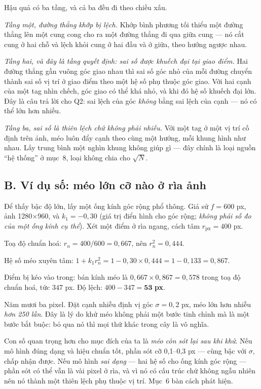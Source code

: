 \documentclass[../../marker.tex]{subfiles}
\begin{document}
Hậu quả có ba tầng, và cả ba đều đi theo chiều xấu.

\emph{Tầng một, đường thẳng khớp bị lệch.} Khớp bình phương tối thiểu một đường thẳng lên một cung cong cho ra một đường thẳng đi qua giữa cung --- nó cắt cung ở hai chỗ và lệch khỏi cung ở hai đầu và ở giữa, theo hướng ngược nhau.

\emph{Tầng hai, và đây là tầng quyết định: sai số được \emph{khuếch đại} tại giao điểm.} Hai đường thẳng gần vuông góc giao nhau thì sai số góc nhỏ của mỗi đường chuyển thành sai số vị trí ở giao điểm theo một hệ số phụ thuộc góc giao. Với hai cạnh của một tag nhìn chếch, góc giao có thể khá nhỏ, và khi đó hệ số khuếch đại lớn. Đây là câu trả lời cho Q2: sai lệch của góc \emph{không} bằng sai lệch của cạnh --- nó có thể lớn hơn nhiều.

\emph{Tầng ba, sai số là thiên lệch chứ không phải nhiễu.} Với một tag ở một vị trí cố định trên ảnh, méo luôn đẩy cạnh theo cùng một hướng, mỗi khung hình như nhau. Lấy trung bình một nghìn khung không giúp gì --- đây chính là loại nguồn ``hệ thống'' ở  mục~8, loại không chia cho \(\sqrt{N}\).

\subsection{B. Ví dụ số: méo lớn cỡ nào ở rìa ảnh}

Để thấy bậc độ lớn, lấy một ống kính góc rộng phổ thông. Giả sử \(f = 600\) px, ảnh 1280\(\times\)960, và \(k_1 = -0{,}30\) (giá trị điển hình cho góc rộng; \emph{không phải số đo của một ống kính cụ thể}). Xét một điểm ở rìa ngang, cách tâm \(r_{\text{px}} = 400\) px.

Toạ độ chuẩn hoá: \(r_n = 400/600 = 0{,}667\), nên \(r_n^2 = 0{,}444\).

Hệ số méo xuyên tâm: \(1 + k_1 r_n^2 = 1 - 0{,}30 \times 0{,}444 = 1 - 0{,}133 = 0{,}867\).

Điểm bị kéo vào trong: bán kính méo là \(0{,}667 \times 0{,}867 = 0{,}578\) trong toạ độ chuẩn hoá, tức \(347\) px. Độ lệch: \(400 - 347 = \mathbf{53}\) \textbf{px}.

Năm mươi ba pixel. Đặt cạnh nhiễu định vị góc \(\sigma = 0{,}2\) px, méo lớn hơn nhiễu \emph{hơn 250 lần}. Đây là lý do khử méo không phải một bước tinh chỉnh mà là một bước bắt buộc: bỏ qua nó thì mọi thứ khác trong cây là vô nghĩa.

Con số quan trọng hơn cho mục đích của ta là \emph{méo còn sót lại sau khi khử}. Nếu mô hình đúng dạng và hiệu chuẩn tốt, phần sót cỡ 0,1--0,3 px --- cùng bậc với \(\sigma\), chấp nhận được. Nếu mô hình \emph{sai dạng} --- hai hệ số cho ống kính góc rộng --- phần sót có thể vẫn là vài pixel ở rìa, và vì nó có cấu trúc chứ không ngẫu nhiên nên nó thành một thiên lệch phụ thuộc vị trí. Mục~6 bàn cách phát hiện.
\end{document}
